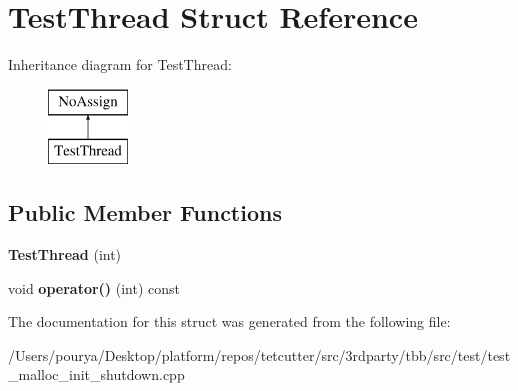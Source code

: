 \hypertarget{structTestThread}{}\section{Test\+Thread Struct Reference}
\label{structTestThread}
Inheritance diagram for Test\+Thread\+:\begin{figure}[H]
\begin{center}
\leavevmode
\includegraphics[height=2.000000cm]{structTestThread}
\end{center}
\end{figure}
\subsection*{Public Member Functions}
\begin{DoxyCompactItemize}
\item 
\hypertarget{structTestThread_aa9a787bc3e891d32c63e33374c31b2f3}{}{\bfseries Test\+Thread} (int)\label{structTestThread_aa9a787bc3e891d32c63e33374c31b2f3}

\item 
\hypertarget{structTestThread_ab621dfae81084c76ceebeca29d605aac}{}void {\bfseries operator()} (int) const \label{structTestThread_ab621dfae81084c76ceebeca29d605aac}

\end{DoxyCompactItemize}


The documentation for this struct was generated from the following file\+:\begin{DoxyCompactItemize}
\item 
/\+Users/pourya/\+Desktop/platform/repos/tetcutter/src/3rdparty/tbb/src/test/test\+\_\+malloc\+\_\+init\+\_\+shutdown.\+cpp\end{DoxyCompactItemize}
